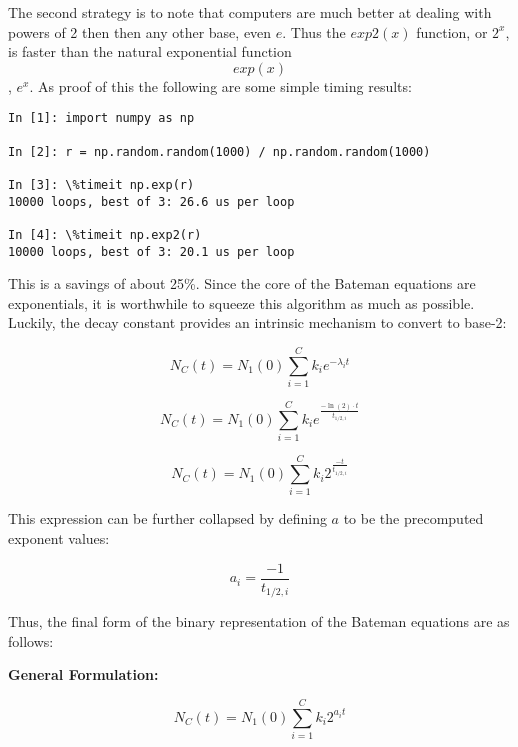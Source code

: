 \documentclass{anstrans}
\begin{document}
The second strategy is to note that computers are much better at dealing with powers of
2 then then any other base, even $e$. Thus the $exp2(x)$ function, or $2^x$,
is faster than the natural exponential function $$exp(x)$$, $e^x$.  As proof of this
the following are some simple timing results:

\begin{lstlisting}[caption={Exponential Timing Comparison}, 
                   label=expcmp]
In [1]: import numpy as np

In [2]: r = np.random.random(1000) / np.random.random(1000)

In [3]: \%timeit np.exp(r)
10000 loops, best of 3: 26.6 us per loop

In [4]: \%timeit np.exp2(r)
10000 loops, best of 3: 20.1 us per loop
\end{lstlisting}

This is a savings of about 25\%.  Since the core of the Bateman equations are exponentials, 
it is worthwhile to squeeze this algorithm as much as possible.  Luckily, the decay constant
provides an intrinsic mechanism to convert to base-2:

\begin{equation}
\label{b2-0}
N_C(t) = N_1(0) \sum_{i=1}^C k_{i} e^{-\lambda_i t}
\end{equation}

\begin{equation}
\label{b2-1}
N_C(t) = N_1(0) \sum_{i=1}^C k_{i} e^{\frac{-\ln(2)\cdot t}{t_{1/2,i}}}
\end{equation}

\begin{equation}
\label{b2-2}
N_C(t) = N_1(0) \sum_{i=1}^C k_{i} 2^{\frac{-t}{t_{1/2,i}}}
\end{equation}

This expression can be further collapsed by defining $a$ to be the precomputed 
exponent values:

\begin{equation}
\label{a_i}
a_i = \frac{-1}{t_{1/2,i}}
\end{equation}

Thus, the final form of the binary representation of the Bateman equations are
as follows:

\textbf{General Formulation:}

\begin{equation}
\label{nc_wakka}
N_C(t) = N_1(0) \sum_{i=1}^C k_{i} 2^{a_i t}
\end{equation}
\end{document}
